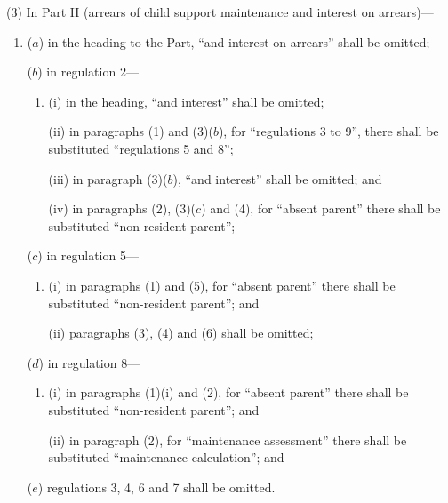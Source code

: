 \documentclass[12pt,a4paper]{article}
\begin{document}
(3) In Part II (arrears of child support maintenance and interest on arrears)—
\begin{enumerate}\item[]
($a$) in the heading to the Part, “and interest on arrears” shall be omitted;

($b$) in regulation 2—
\begin{enumerate}\item[]
(i) in the heading, “and interest” shall be omitted;

(ii) in paragraphs (1) and (3)($b$), for “regulations 3 to 9”, there shall be substituted “regulations 5 and 8”;

(iii) in paragraph (3)($b$), “and interest” shall be omitted; and

(iv) in paragraphs (2), (3)($c$)  and (4), for “absent parent” there shall be substituted “non-resident parent”;
\end{enumerate}

($c$) in regulation 5—
\begin{enumerate}\item[]
(i) in paragraphs (1) and (5), for “absent parent” there shall be substituted “non-resident parent”; and

(ii) paragraphs (3), (4) and (6) shall be omitted;
\end{enumerate}

($d$) in regulation 8—
\begin{enumerate}\item[]
(i) in paragraphs (1)(i)  and (2), for “absent parent” there shall be substituted “non-resident parent”; and

(ii) in paragraph (2), for “maintenance assessment” there shall be substituted “maintenance calculation”; and
\end{enumerate}

($e$) regulations 3, 4, 6 and 7 shall be omitted.
\end{enumerate}
\end{document}
